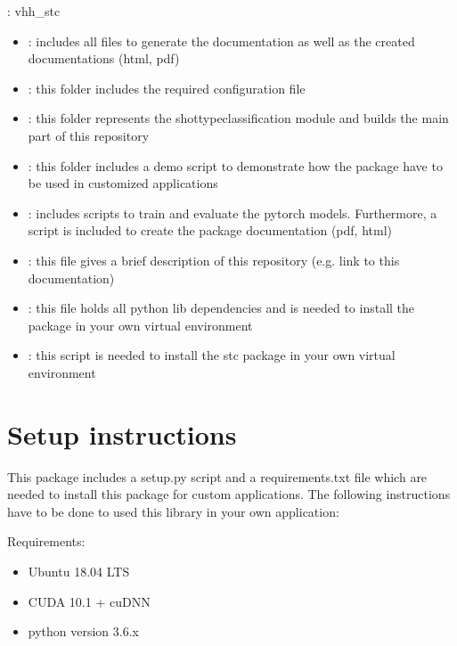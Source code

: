 \documentclass[letterpaper,10pt,english]{sphinxmanual}
\begin{document}
: vhh\_stc
\begin{itemize}
\item {} 
: includes all files to generate the documentation as well as the created documentations (html, pdf)

\item {} 
: this folder includes the required configuration file

\item {} 
: this folder represents the shot\sphinxhyphen{}type\sphinxhyphen{}classification module and builds the main part of this repository

\item {} 
: this folder includes a demo script to demonstrate how the package have to be used in customized applications

\item {} 
: includes scripts to train and evaluate the pytorch models. Furthermore, a script is included to create the package documentation (pdf, html)

\item {} 
: this file gives a brief description of this repository (e.g. link to this documentation)

\item {} 
: this file holds all python lib dependencies and is needed to install the package in your own virtual environment

\item {} 
: this script is needed to install the stc package in your own virtual environment

\end{itemize}


\chapter{Setup  instructions}
\label{\detokenize{index:setup-instructions}}
This package includes a setup.py script and a requirements.txt file which are needed to install this package for custom applications.
The following instructions have to be done to used this library in your own application:

Requirements:
\begin{itemize}
\item {} 
Ubuntu 18.04 LTS

\item {} 
CUDA 10.1 + cuDNN

\item {} 
python version 3.6.x

\end{itemize}
\end{document}
